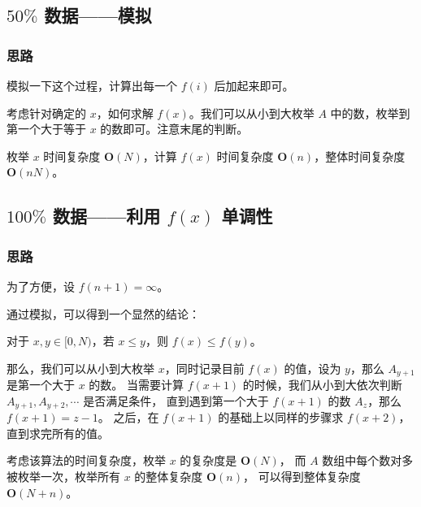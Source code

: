 
% 

\subsection{\texorpdfstring{$50\%$}{50\%} 数据——模拟}

\subsubsection{思路}

模拟一下这个过程，计算出每一个 $f(i)$ 后加起来即可。

考虑针对确定的 $x$，如何求解 $f(x)$。我们可以从小到大枚举 $A$ 中的数，枚举到第一个大于等于 $x$ 的数即可。注意末尾的判断。

枚举 $x$ 时间复杂度 $\mathbf{O}(N)$，计算 $f(x)$ 时间复杂度 $\mathbf{O}(n)$，整体时间复杂度 $\mathbf{O}(nN)$。

\subsection{\texorpdfstring{$100\%$}{100\%} 数据——利用 \texorpdfstring{$f(x)$}{f(x)} 单调性}

\subsubsection{思路}

为了方便，设 $f(n+1) = \infty$。

通过模拟，可以得到一个显然的结论：

\begin{theorem}[$f(x)$的单调性] \label{thm:fx_monotonicity}
    对于 $x,y\in [0,N)$，若 $x \le y$，则 $f(x) \le f(y)$。
\end{theorem}

那么，我们可以从小到大枚举 $x$，同时记录目前 $f(x)$ 的值，设为 $y$，那么 $A_{y+1}$ 是第一个大于 $x$ 的数。
当需要计算 $f(x+1)$ 的时候，我们从小到大依次判断 $A_{y+1},A_{y+2},\cdots$ 是否满足条件，
直到遇到第一个大于 $f(x+1)$ 的数 $A_z$，那么 $f(x+1)=z-1$。
之后，在 $f(x+1)$ 的基础上以同样的步骤求 $f(x+2)$，直到求完所有的值。

考虑该算法的时间复杂度，枚举 $x$ 的复杂度是 $\mathbf{O}(N)$，
而 $A$ 数组中每个数对多被枚举一次，枚举所有 $x$ 的整体复杂度 $\mathbf{O}(n)$，
可以得到整体复杂度 $\mathbf{O}(N+n)$。

